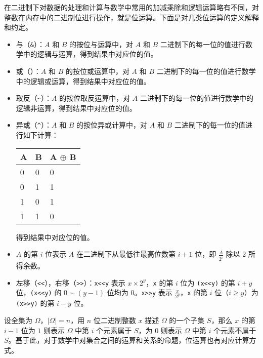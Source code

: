在二进制下对数据的处理和计算与数学中常用的加减乘除和逻辑运算略有不同，对整数在内存中的二进制位进行操作，就是位运算。下面是对几类位运算的定义解释和约定。

\begin{itemize}
\item
  与（\texttt{\&}）：\(A\) 和 \(B\) 的按位与运算中，对 \(A\) 和 \(B\)
  二进制下的每一位的值进行数学中的逻辑与运算，得到结果中对应位的值。
\item
  或（\texttt{\textbar{}}）：\(A\) 和 \(B\) 的按位或运算中，对 \(A\) 和
  \(B\)
  二进制下的每一位的值进行数学中的逻辑或运算，得到结果中对应位的值。
\item
  取反（\texttt{\textasciitilde{}}）：\(A\) 的按位取反运算中，对 \(A\)
  二进制下的每一位的值进行数学中的逻辑非运算，得到结果中对应位的值。
\item
  异或（\texttt{\^{}}）：\(A\) 和 \(B\) 的按位异或计算中，对 \(A\) 和
  \(B\) 二进制下的每一位的值进行如下计算：

  \begin{longtable}[]{@{}lll@{}}
  \toprule
  A & B & A \(\oplus\) B \\
  \midrule
  \endhead
  0 & 0 & 0 \\
  0 & 1 & 1 \\
  1 & 0 & 1 \\
  1 & 1 & 0 \\
  \bottomrule
  \end{longtable}

  得到结果中对应位的值。
\item
  \(A\) 的第 \(i\) 位表示 \(A\) 在二进制下从最低往最高位数第 \(i+1\)
  位，即 \(\frac{A}{2^i}\) 除以 \(2\) 所得余数。
\item
  左移（\texttt{\textless{}\textless{}}），右移（\texttt{\textgreater{}\textgreater{}}）：\texttt{x\textless{}\textless{}y}
  表示 \(x\times 2^y\)，\texttt{x} 的第 \(i\) 位为
  \texttt{(x\textless{}\textless{}y)} 的第 \(i+y\)
  位，\texttt{(x\textless{}\textless{}y)} 的 \(0\sim (y-1)\) 位均为
  \(0\)。\texttt{x\textgreater{}\textgreater{}y} 表示
  \(\frac{x}{2^y}\)，\texttt{x} 的第 \(i\) 位（\(i\ge y\)）为
  \texttt{(x\textgreater{}\textgreater{}y)} 的第 \(i-y\) 位。
\end{itemize}

设全集为 \(\Omega\)，\(|\Omega|=n\)，用 \(n\) 位二进制整数 \(x\) 描述
\(\Omega\) 的一个子集 \(S\)，那么 \(x\) 的第 \(i-1\) 位为 \(1\) 则表示
\(\Omega\) 中第 \(i\) 个元素属于 \(S\)，为 \(0\) 则表示 \(\Omega\) 中第
\(i\) 个元素不属于
\(S\)。基于此，对于数学中对集合之间的运算和关系的命题，位运算也有对应计算方式。

